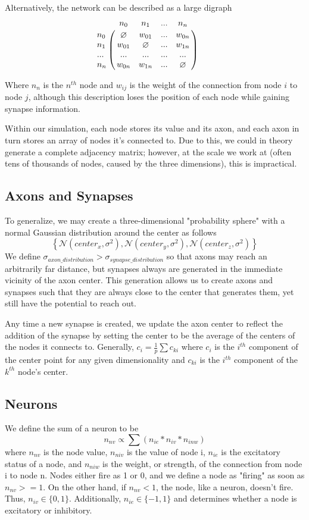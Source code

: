 \documentclass[12pt]{article}
\begin{document}
Alternatively, the network can be described as a large digraph
$$
\bordermatrix{
        & n_0 & n_1 & ... & n_n \cr
    n_0 & \o & w_{01} & ... & w_{0n} \cr
    n_1 & w_{01} & \o & ... & w_{1n} \cr
    ... & ... & ... & ... & ... \cr
    n_n & w_{0n} & w_{1n} & ... & \o } \qquad
$$

Where $n_n$ is the $n^{th}$ node and $w_{ij}$ is the weight of the connection from node $i$ to node $j$, although this description loses the position of each node while gaining synapse information.

Within our simulation, each node stores its value and its axon, and each axon in turn stores an array of nodes it's connected to.  Due to this, we could in theory generate a complete adjacency matrix; however, at the scale we work at (often tens of thousands of nodes, caused by the three dimensions), this is impractical.

\subsection{Axons and Synapses} \label{connections}

To generalize, we may create a three-dimensional "probability sphere" with a normal Gaussian distribution around the center as follows
$$\left\{\mathcal{N}(center_x, \sigma^{2}), \mathcal{N}(center_y, \sigma^{2}), \mathcal{N}(center_z, \sigma^{2})\right\}$$
We define $\sigma_{axon\_distribution} > \sigma_{synapse\_distribution}$ so that axons may reach an arbitrarily far distance, but synapses always are generated in the immediate vicinity of the axon center.  This generation allows us to create axons and synapses such that they are always close to the center that generates them, yet still have the potential to reach out.

Any time a new synapse is created, we update the axon center to reflect the addition of the synapse by setting the center to be the average of the centers of the nodes it connects to.  Generally, $c_i = \frac{1}{p}\sum c_{ki}$ where $c_i$ is the $i^{th}$ component of the center point for any given dimensionality and $c_{ki}$ is the $i^{th}$ component of the $k^{th}$ node's center.

\subsection{Neurons} \label{neurons}

We define the sum of a neuron to be
$$n_{nv} \propto \sum (n_{ie} * n_{iv} * n_{inw})$$
where $n_{nv}$ is the node value, $n_{niv}$ is the value of node i, $n_{ie}$ is the excitatory status of a node, and $n_{niw}$ is the weight, or strength, of the connection from node i to node n.
Nodes either fire as 1 or 0, and we define a node as "firing" as soon as $n_{nv} >= 1$.  On the other hand, if $n_{nv} < 1$, the node, like a neuron, doesn't fire.  Thus, $n_{iv} \in \{0, 1\}$.  Additionally, $n_{ie} \in \{-1, 1\}$ and determines whether a node is excitatory or inhibitory.
\end{document}
